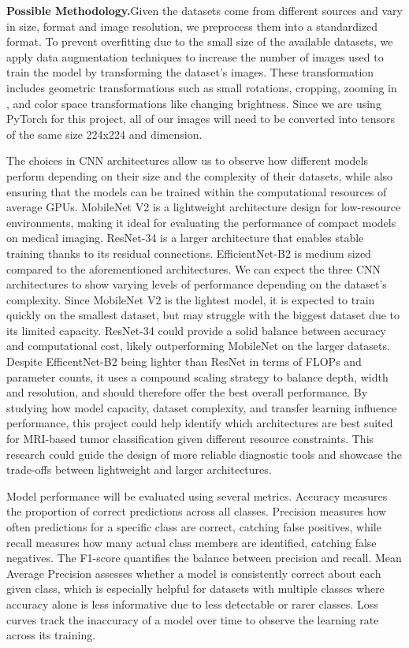\documentclass[10pt,twocolumn,letterpaper]{article}
\begin{document}
\textbf{Possible Methodology.}Given the datasets come from different sources and vary in size, format and image resolution, we preprocess them into a standardized format. To prevent overfitting due to the small size of the available datasets, we apply data augmentation techniques to  increase the number of images used to train the model by transforming the dataset's images.\cite{dataaugment} These transformation includes geometric transformations such as small rotations, cropping, zooming in , and color space transformations like changing brightness.\cite{datacamp_augmentation}
Since we are using PyTorch for this project, all of our images will need to be converted into tensors of the same size 224x224 and dimension.


The choices in CNN architectures allow us to observe how different models perform depending on their size and the complexity of their datasets, while also ensuring that the models can be trained within the computational resources of average GPUs. MobileNet V2\cite{mobilenet} is a lightweight architecture design for low-resource environments, making it ideal for evaluating the performance of compact models on medical imaging. ResNet-34\cite{resnet} is a larger architecture that enables stable training thanks to its residual connections. EfficientNet-B2\cite{efficientnet} is medium sized compared to the aforementioned architectures. We can expect the three CNN architectures to show varying levels of performance depending on the dataset’s complexity. Since MobileNet V2 is the lightest model, it is expected to train quickly on the smallest dataset, but may struggle with the biggest dataset due to its limited capacity. ResNet-34 could provide a solid balance between accuracy and computational cost, likely outperforming MobileNet on the larger datasets. Despite EfficentNet-B2 being lighter than ResNet in terms of FLOPs and parameter counts, it uses a compound scaling strategy to balance depth, width and resolution, and should therefore offer the best overall performance.
By studying how model capacity, dataset complexity, and transfer learning influence performance, this project could help identify which architectures are best suited for MRI-based tumor classification given different resource constraints. This research could guide the design of more reliable diagnostic tools and showcase the trade-offs between lightweight and larger architectures.

Model performance will be evaluated using several metrics.\cite{modelmetrics} Accuracy measures the proportion of correct predictions across all classes. Precision measures how often predictions for a specific class are correct, catching false positives, while recall measures how many actual class members are identified, catching false negatives. The F1-score quantifies the balance between precision and recall. Mean Average Precision assesses whether a model is consistently correct about each given class, which is especially helpful for datasets with multiple classes where accuracy alone is less informative due to less detectable or rarer classes. Loss curves track the inaccuracy of a model over time to observe the learning rate across its training.\newpage
\end{document}
